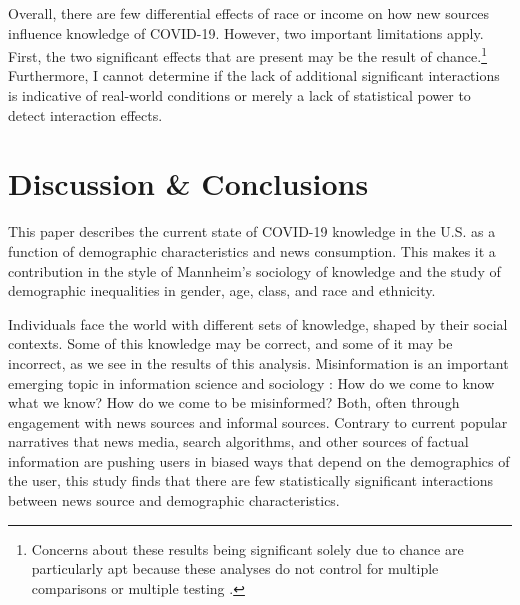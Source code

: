 \documentclass[11pt]{article}
\begin{document}

Overall, there are few differential effects of race or income on how new sources influence knowledge of COVID-19. However, two important limitations apply. First, the two significant effects that are present may be the result of chance.\footnote
    {Concerns about these results being significant solely due to chance are particularly apt because these analyses do not control for multiple comparisons or multiple testing \citep{Howell2012}.}
Furthermore, I cannot determine if the lack of additional significant interactions is indicative of real-world conditions or merely a lack of statistical power to detect interaction effects.


\section{Discussion \& Conclusions}\label{sec:conclusion}

This paper describes the current state of COVID-19 knowledge in the U.S. as a function of demographic characteristics and news consumption. This makes it a contribution in the style of Mannheim's sociology of knowledge \citep{Mannheim1929,Swidler1994} and the study of demographic inequalities in gender, age, class, and race and ethnicity.

Individuals face the world with different sets of knowledge, shaped by their social contexts. Some of this knowledge may be correct, and some of it may be incorrect, as we see in the results of this analysis. Misinformation is an important emerging topic in information science and sociology \citep{Metaxa-Kakavouli2017}: How do we come to know what we know? How do we come to be misinformed? Both, often through engagement with news sources and informal sources. Contrary to current popular narratives that news media, search algorithms, and other sources of factual information are pushing users in biased ways that depend on the demographics of the user, this study finds that there are few statistically significant interactions between news source and demographic characteristics.
\end{document}
